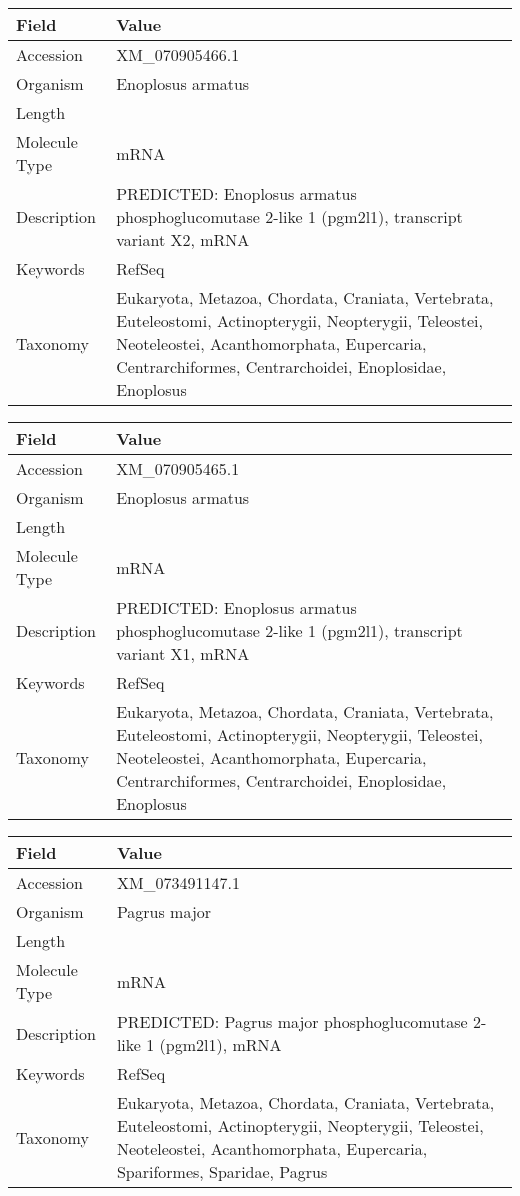 \documentclass[10pt]{article}
\begin{document}
\vspace{1em}
{\footnotesize
\begin{longtable}{>{\raggedright\arraybackslash}p{4.5cm} >{\raggedright\arraybackslash}p{11.5cm}}
\textbf{Field} & \textbf{Value} \\
\hline
Accession & XM\_070905466.1 \\
Organism & Enoplosus armatus \\
Length & 3375 \\
Molecule Type & mRNA \\
Description & PREDICTED: Enoplosus armatus phosphoglucomutase 2-like 1 (pgm2l1), transcript variant X2, mRNA \\
Keywords & RefSeq \\
Taxonomy & Eukaryota, Metazoa, Chordata, Craniata, Vertebrata, Euteleostomi, Actinopterygii, Neopterygii, Teleostei, Neoteleostei, Acanthomorphata, Eupercaria, Centrarchiformes, Centrarchoidei, Enoplosidae, Enoplosus \\
\end{longtable}
}

\vspace{1em}
{\footnotesize
\begin{longtable}{>{\raggedright\arraybackslash}p{4.5cm} >{\raggedright\arraybackslash}p{11.5cm}}
\textbf{Field} & \textbf{Value} \\
\hline
Accession & XM\_070905465.1 \\
Organism & Enoplosus armatus \\
Length & 3653 \\
Molecule Type & mRNA \\
Description & PREDICTED: Enoplosus armatus phosphoglucomutase 2-like 1 (pgm2l1), transcript variant X1, mRNA \\
Keywords & RefSeq \\
Taxonomy & Eukaryota, Metazoa, Chordata, Craniata, Vertebrata, Euteleostomi, Actinopterygii, Neopterygii, Teleostei, Neoteleostei, Acanthomorphata, Eupercaria, Centrarchiformes, Centrarchoidei, Enoplosidae, Enoplosus \\
\end{longtable}
}

\vspace{1em}
{\footnotesize
\begin{longtable}{>{\raggedright\arraybackslash}p{4.5cm} >{\raggedright\arraybackslash}p{11.5cm}}
\textbf{Field} & \textbf{Value} \\
\hline
Accession & XM\_073491147.1 \\
Organism & Pagrus major \\
Length & 2995 \\
Molecule Type & mRNA \\
Description & PREDICTED: Pagrus major phosphoglucomutase 2-like 1 (pgm2l1), mRNA \\
Keywords & RefSeq \\
Taxonomy & Eukaryota, Metazoa, Chordata, Craniata, Vertebrata, Euteleostomi, Actinopterygii, Neopterygii, Teleostei, Neoteleostei, Acanthomorphata, Eupercaria, Spariformes, Sparidae, Pagrus \\
\end{longtable}
}
\end{document}
